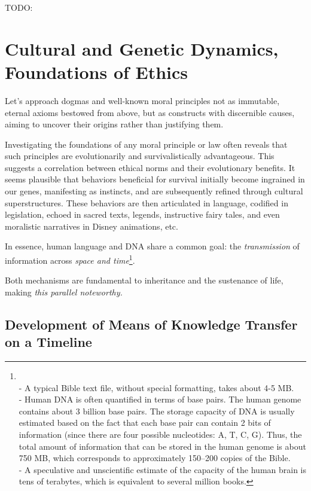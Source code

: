 \documentclass[11pt,a4]{article}
\begin{document}
    TODO:


\section{Cultural and Genetic Dynamics, Foundations of Ethics}

    Let's approach dogmas and well-known moral principles not as immutable, eternal axioms bestowed from above, but as constructs with discernible causes, aiming to uncover their origins rather than justifying them.
    \par
    Investigating the foundations of any moral principle or law often reveals that such principles are evolutionarily and survivalistically advantageous. This suggests a correlation between ethical norms and their evolutionary benefits. It seems plausible that behaviors beneficial for survival initially become ingrained in our genes, manifesting as instincts, and are subsequently refined through cultural superstructures. These behaviors are then articulated in language, codified in legislation, echoed in sacred texts, legends, instructive fairy tales, and even moralistic narratives in Disney animations, etc.

    \par
    In essence, human language and DNA share a common goal: the \textit{transmission} of information across \textit{space and time}\footnote{\\- A typical Bible text file, without special formatting, takes about 4-5 MB. \\
    - Human DNA is often quantified in terms of base pairs. The human genome contains about 3 billion base pairs. The storage capacity of DNA is usually estimated based on the fact that each base pair can contain 2 bits of information (since there are four possible nucleotides: A, T, C, G).
    Thus, the total amount of information that can be stored in the human genome is about 750 MB, which corresponds to approximately 150–200 copies of the Bible.\\
    - A speculative and unscientific estimate of the capacity of the human brain is tens of terabytes, which is equivalent to several million books.}.

    \par
    Both mechanisms are fundamental to inheritance and the sustenance of life, making \textit{this parallel noteworthy.}





    \subsection{Development of Means of Knowledge Transfer on a Timeline}
\end{document}

